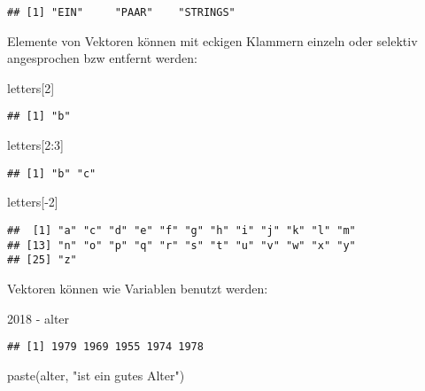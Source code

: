 \documentclass[11pt,german,a4paper]{article}
\newenvironment{Shaded}{\begin{snugshade}}{\end{snugshade}}
\newcommand{\DecValTok}[1]{\textcolor[rgb]{0.00,0.00,0.81}{#1}}
\newcommand{\FunctionTok}[1]{\textcolor[rgb]{0.00,0.00,0.00}{#1}}
\newcommand{\NormalTok}[1]{#1}
\newcommand{\SpecialCharTok}[1]{\textcolor[rgb]{0.00,0.00,0.00}{#1}}
\newcommand{\StringTok}[1]{\textcolor[rgb]{0.31,0.60,0.02}{#1}}
\begin{document}
\begin{verbatim}
## [1] "EIN"     "PAAR"    "STRINGS"
\end{verbatim}

Elemente von Vektoren können mit eckigen Klammern einzeln oder selektiv angesprochen bzw entfernt werden:

\begin{Shaded}
\begin{Highlighting}[]
\NormalTok{letters[}\DecValTok{2}\NormalTok{]}
\end{Highlighting}
\end{Shaded}

\begin{verbatim}
## [1] "b"
\end{verbatim}

\begin{Shaded}
\begin{Highlighting}[]
\NormalTok{letters[}\DecValTok{2}\SpecialCharTok{:}\DecValTok{3}\NormalTok{]}
\end{Highlighting}
\end{Shaded}

\begin{verbatim}
## [1] "b" "c"
\end{verbatim}

\begin{Shaded}
\begin{Highlighting}[]
\NormalTok{letters[}\SpecialCharTok{{-}}\DecValTok{2}\NormalTok{]}
\end{Highlighting}
\end{Shaded}

\begin{verbatim}
##  [1] "a" "c" "d" "e" "f" "g" "h" "i" "j" "k" "l" "m"
## [13] "n" "o" "p" "q" "r" "s" "t" "u" "v" "w" "x" "y"
## [25] "z"
\end{verbatim}

Vektoren können wie Variablen benutzt werden:

\begin{Shaded}
\begin{Highlighting}[]
\DecValTok{2018} \SpecialCharTok{{-}}\NormalTok{ alter}
\end{Highlighting}
\end{Shaded}

\begin{verbatim}
## [1] 1979 1969 1955 1974 1978
\end{verbatim}

\begin{Shaded}
\begin{Highlighting}[]
\FunctionTok{paste}\NormalTok{(alter, }\StringTok{"ist ein gutes Alter"}\NormalTok{)}
\end{Highlighting}
\end{Shaded}
\end{document}
